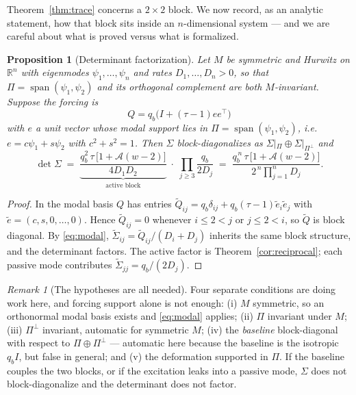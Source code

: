 \documentclass[11pt]{article}
\theoremstyle{plain}
\newtheorem{proposition}[theorem]{Proposition}
\theoremstyle{definition}
\theoremstyle{remark}
\newtheorem{remark}[theorem]{Remark}
\newcommand{\Real}{\mathbb{R}}
\newcommand{\Sig}{\Sigma}
\newcommand{\Aco}{\mathcal{A}}
\newcommand{\T}{^{\!\top}}
\begin{document}
Theorem~\ref{thm:trace} concerns a $2\times2$ block. We now record, as an analytic
statement, how that block sits inside an $n$-dimensional system --- and we are careful about what
is proved versus what is formalized.

\begin{proposition}[Determinant factorization]\label{prop:factor}
Let $M$ be symmetric and Hurwitz on $\Real^n$ with eigenmodes $\psi_1,\dots,\psi_n$ and rates
$D_1,\dots,D_n>0$, so that $\Pi=\operatorname{span}(\psi_1,\psi_2)$ and its orthogonal
complement are both $M$-invariant. Suppose the forcing is
\begin{equation}
  Q = q_b\bigl(I+(\tau-1)ee\T\bigr) \label{eq:Qambient}
\end{equation}
with $e$ a unit vector whose modal support lies in $\Pi=\operatorname{span}(\psi_1,\psi_2)$, i.e.
$e=c\psi_1+s\psi_2$ with $c^2+s^2=1$. Then $\Sig$ block-diagonalizes as
$\Sig|_\Pi\oplus\Sig|_{\Pi^{\perp}}$ and
\begin{equation}
  \det\Sig \;=\; \underbrace{\frac{q_b^2\,\tau\,\bigl[1+\Aco(w-2)\bigr]}{4D_1D_2}}_{\text{active block}}
  \;\cdot\;
  \prod_{j\ge3}\frac{q_b}{2D_j}
  \;=\; \frac{q_b^{\,n}\,\tau\,\bigl[1+\Aco(w-2)\bigr]}{2^{\,n}\prod_{j=1}^{n}D_j}. \label{eq:factored}
\end{equation}
\end{proposition}

\begin{proof}
In the modal basis $Q$ has entries $\widetilde Q_{ij}=q_b\delta_{ij}+q_b(\tau-1)\tilde e_i\tilde e_j$
with $\tilde e=(c,s,0,\dots,0)$. Hence $\widetilde Q_{ij}=0$ whenever $i\le2<j$ or $j\le2<i$, so
$\widetilde Q$ is block diagonal. By \eqref{eq:modal}, $\widetilde\Sig_{ij}=\widetilde Q_{ij}/(D_i+D_j)$
inherits the same block structure, and the determinant factors. The active factor is
Theorem~\ref{cor:reciprocal}; each passive mode contributes $\widetilde\Sig_{jj}=q_b/(2D_j)$.
\end{proof}

\begin{remark}[The hypotheses are all needed]\label{rem:factorhyp}
Four separate conditions are doing work here, and forcing support alone is not enough:
(i) $M$ symmetric, so an orthonormal modal basis exists and \eqref{eq:modal} applies;
(ii) $\Pi$ invariant under $M$; (iii) $\Pi^{\perp}$ invariant, automatic for symmetric $M$;
(iv) the \emph{baseline} block-diagonal with respect to $\Pi\oplus\Pi^{\perp}$ --- automatic
here because the baseline is the isotropic $q_bI$, but false in general; and (v) the
deformation supported in $\Pi$. If the baseline couples the two blocks, or if the excitation
leaks into a passive mode, $\Sig$ does not block-diagonalize and the determinant does not
factor.
\end{remark}
\end{document}
